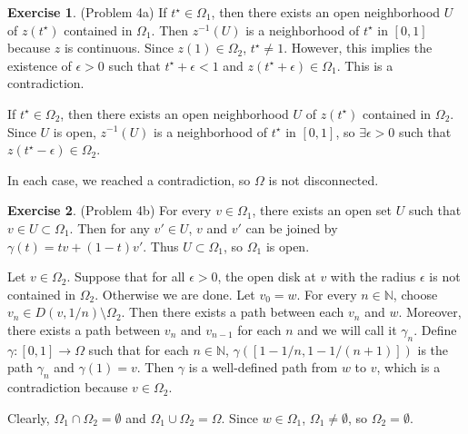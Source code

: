 \documentclass[12pt, psamsfonts]{amsart}
\theoremstyle{definition}
\newtheorem*{exer}{Exercise}
\theoremstyle{remark}
\numberwithin{equation}{section}
\begin{document}
\begin{exer}{(Problem 4a)}
  If $t^{\star} \in \Omega_1$, then there exists an open neighborhood $U$ of $z(t^{\star})$ contained in $\Omega_1$.
  Then $z^{-1}(U)$ is a neighborhood of $t^{\star}$ in $[0, 1]$ because $z$ is continuous.
  Since $z(1) \in \Omega_2$, $t^{\star} \ne 1$.
  However, this implies the existence of $\epsilon > 0$ such that $t^{\star} + \epsilon < 1$ and $z(t^{\star} + \epsilon) \in \Omega_1$.
  This is a contradiction.

  If $t^{\star} \in \Omega_2$, then there exists an open neighborhood $U$ of $z(t^{\star})$ contained in $\Omega_2$.
  Since $U$ is open, $z^{-1}(U)$ is a neighborhood of $t^{\star}$ in $[0, 1]$, so $\exists \epsilon > 0$ such that $z(t^{\star} - \epsilon) \in \Omega_2$.

  In each case, we reached a contradiction, so $\Omega$ is not disconnected.
\end{exer}

\begin{exer}{(Problem 4b)}
  For every $v \in \Omega_1$, there exists an open set $U$ such that $v \in U \subset \Omega_1$.
  Then for any $v' \in U$, $v$ and $v'$ can be joined by $\gamma(t) = tv + (1 - t)v'$.
  Thus $U \subset \Omega_1$, so $\Omega_1$ is open.

  Let $v \in \Omega_2$.
  Suppose that for all $\epsilon > 0$, the open disk at $v$ with the radius $\epsilon$ is not contained in $\Omega_2$.
  Otherwise we are done.
  Let $v_0 = w$.
  For every $n \in \mathbb{N}$, choose $v_n \in D(v, 1/n) \setminus \Omega_2$.
  Then there exists a path between each $v_n$ and $w$.
  Moreover, there exists a path between $v_n$ and $v_{n - 1}$ for each $n$ and we will call it $\gamma_n$.
  Define $\gamma: [0, 1] \rightarrow \Omega$ such that for each $n \in \mathbb{N}$, $\gamma([1 - 1/n, 1 - 1/(n+1)])$ is the path $\gamma_n$ and $\gamma(1) = v$.
  Then $\gamma$ is a well-defined path from $w$ to $v$, which is a contradiction because $v \in \Omega_2$.

  Clearly, $\Omega_1 \cap \Omega_2 = \emptyset$ and $\Omega_1 \cup \Omega_2 = \Omega$.
  Since $w \in \Omega_1$, $\Omega_1 \ne \emptyset$, so $\Omega_2 = \emptyset$.
\end{exer}
\end{document}
